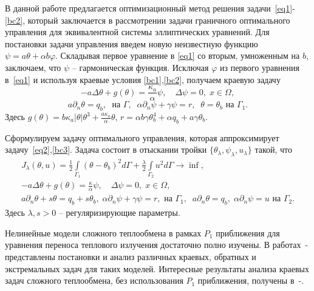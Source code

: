 В данной работе предлагается оптимизационный метод решения задачи~\eqref{eq1}-\eqref{bc2},
который заключается в рассмотрении задачи граничного оптимального
управления для эквивалентной системы эллиптических уравнений.
Для постановки задачи управления введем новую неизвестную функцию
$\psi= a\theta + \alpha b \varphi$. Складывая первое уравнение в \eqref{eq1} со вторым, умноженным на $b$,
заключаем, что $\psi$ -- гармоническая функция.
Исключая $\varphi$ из первого уравнения в~\eqref{eq1} и используя краевые условия
\eqref{bc1},\eqref{bc2},
получаем краевую задачу
\begin{equation}
    \label{eq2}
    - a \Delta \theta + g (\theta) = \frac{\kappa_a}{\alpha}\psi, \quad
    \Delta \psi = 0, \; x \in \Omega,
\end{equation}
\begin{equation}
    \label{bc3}
    a \partial_n \theta = q_b, \; \text{ на }\Gamma, \;\;
    \alpha \partial_n \psi + \gamma \psi  =  r,\;\;
    \theta = \theta_b  \text{ на }\Gamma_1.
\end{equation}
Здесь $g(\theta) = b \kappa_a|\theta|\theta^3 + \frac{a\kappa_a}{\alpha}\theta$, $r=\alpha b \gamma \theta_b^4+ \alpha q_b + a \gamma \theta_b$.

Сформулируем задачу оптимального управления, которая аппроксимирует задачу~\eqref{eq2},\eqref{bc3}.
Задача состоит в отыскании тройки $\{\theta_\lambda,\psi_\lambda,u_\lambda\}$ такой, что
\begin{equation}
    \label{cost}
    \begin{split}
        J_\lambda(\theta, u) = \frac{1}{2}\int\limits_{\Gamma_1} (\theta - \theta_b)^2d\Gamma
        + \frac{\lambda}{2}\int\limits_{\Gamma_2} u^2d\Gamma \rightarrow\inf, \\
        - a \Delta \theta + g (\theta) = \frac{\kappa}{\alpha}\psi, \quad
        \Delta \psi = 0, \; x \in \Omega,\\
        a \partial_n \theta + s \theta = q_b + s\theta_b, \; \alpha \partial_n \psi + \gamma \psi = r,
        \text{ на } \Gamma_1,\;\; a \partial_n \theta  = q_b,\;
        \alpha \partial_n \psi = u \text{ на } \Gamma_2.
    \end{split}
\end{equation}
Здесь $\lambda, s > 0$ -- регуляризирующие параметры.


Нелинейные модели сложного теплообмена в рамках $P_1$ приближения для уравнения переноса теплового
излучения достаточно полно изучены.
В работах~\cite{Pinnau07}-\cite{Mesenev22} представлены постановки и анализ различных краевых,
обратных и экстремальных задач для таких моделей.
Интересные результаты анализа краевых задач сложного теплообмена,
без использования $P_1$ приближения, получены в~\cite{Amosov16}-\cite{Amosov20-1}.

